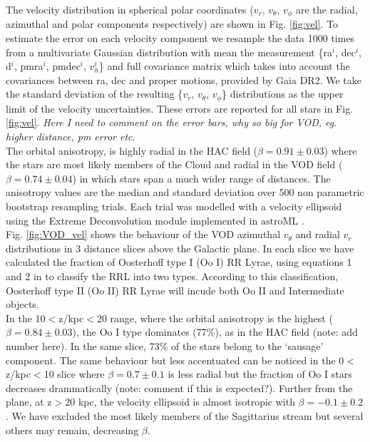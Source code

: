 \documentclass[fleqn,usenatbib]{mnras}
\begin{document}
%
The velocity distribution in spherical polar coordinates ($v_{r}$, $v_{\theta}$, $v_{\phi}$  are the radial, azimuthal and polar components respectively) are shown in Fig. \ref{fig:vel}. To estimate the error on each velocity component we resample the data 1000 times  from a multivariate Gaussian distribution with mean the measurement \{ra$^{i}$, dec$^{i}$, d$^{i}$, pmra$^{i}$, pmdec$^{i}$, $v^{i}_{h}$\} and full covariance matrix which takes into account the covariances between ra, dec and proper motions, provided by Gaia DR2. We take the standard deviation of the resulting \{$v_{r}$, $v_{\theta}$, $v_{\phi}$\} distributions as the upper limit of the velocity uncertainties. These errors are reported for all stars in Fig. \ref{fig:vel}. \textit{Here I need to comment on the error bars, why so big for VOD, eg. higher distance, pm error etc}.\\
 The orbital anisotropy, is highly radial in the HAC field ($\beta = 0.91 \pm 0.03$) where the stars are most likely members of the Cloud and radial in the VOD field ($\beta = 0.74 \pm 0.04$) in which stars span a much wider range of distances. The anisotropy values are the median and standard deviation over 500 non parametric bootstrap resampling trials. Each trial was modelled with a velocity ellipsoid using the Extreme Deconvolution module implemented in  $\mathrm{astroML}$ \citep{astroML}.\\
Fig. \ref{fig:VOD_vel} shows the behaviour of the VOD azimuthal $v_{\theta}$ and radial $v_{r}$ distributions in 3 distance slices above the Galactic plane. In each slice we have calculated the fraction of Oosterhoff type I (Oo I) RR Lyrae, using equations 1 and 2 in \citet{Be2018} to classify the RRL into two types. According to this classification, Oosterhoff type II (Oo II) RR Lyrae will incude both Oo II and Intermediate objects. \\
 In the 10$<$z/kpc$<$20 range, where the orbital anisotropy is the highest ($\beta = 0.84 \pm 0.03$), the Oo I type dominates  (77\%), as in the HAC field (note: add number here). In the same slice, 73\% of the stars belong to the `sausage' component. The same behaviour but less accentuated can be noticed in the 0$<$z/kpc$<$10 slice where $\beta = 0.7 \pm 0.1$ is  less radial but the fraction of Oo I stars decreases drammatically (note: comment if this is expected?). Further from the plane, at  z$>$20 kpc, the velocity ellipsoid is almost isotropic with $\beta = -0.1 \pm 0.2$. We have excluded the most likely members of the Sagittarius stream but several others may remain, decreasing $\beta$. 
\end{document}
